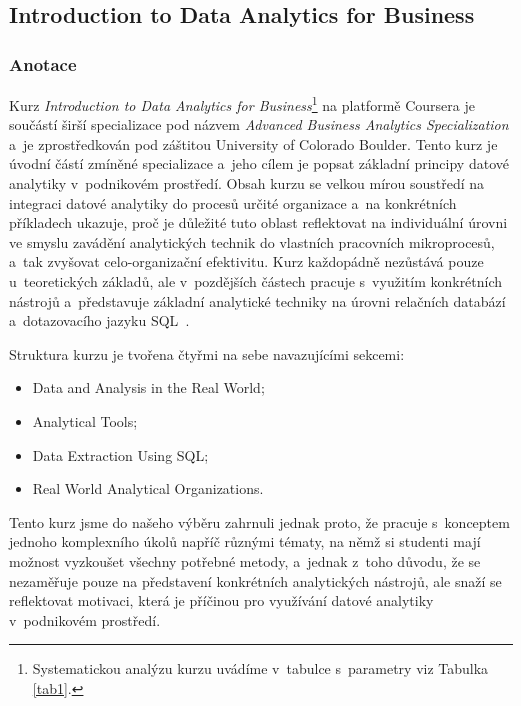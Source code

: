 \hypertarget{introduction-to-data-analytics-for-business}{%
\subsection{Introduction to Data Analytics for Business}\label{introduction-to-data-analytics-for-business}}

\hypertarget{anotace}{%
\subsubsection{Anotace}\label{anotace}}

Kurz \emph{Introduction to Data Analytics for Business}\footnote{Systematickou analýzu kurzu uvádíme v~tabulce s~parametry viz Tabulka \ref{tab1}.} na platformě Coursera je součástí širší specializace pod názvem \emph{Advanced Business Analytics Specialization} a~je zprostředkován pod záštitou University of Colorado Boulder. Tento kurz je úvodní částí zmíněné specializace a~jeho cílem je popsat základní principy datové analytiky v~podnikovém prostředí. Obsah kurzu se velkou mírou soustředí na integraci datové analytiky do procesů určité organizace a~na konkrétních příkladech ukazuje, proč je důležité tuto oblast reflektovat na individuální úrovni ve smyslu zavádění analytických technik do vlastních pracovních mikroprocesů, a~tak zvyšovat celo-organizační efektivitu. Kurz každopádně nezůstává pouze u~teoretických základů, ale v~pozdějších částech pracuje s~využitím konkrétních nástrojů a~představuje základní analytické techniky na úrovni relačních databází a~dotazovacího jazyku SQL~\parencite{course1}.

Struktura kurzu je tvořena čtyřmi na sebe navazujícími sekcemi:

\begin{itemize}
\tightlist
\item
  Data and Analysis in the Real World;
\item
  Analytical Tools;
\item
  Data Extraction Using SQL;
\item
  Real World Analytical Organizations.
\end{itemize}

Tento kurz jsme do našeho výběru zahrnuli jednak proto, že pracuje s~konceptem jednoho komplexního úkolů napříč různými tématy, na němž si studenti mají možnost vyzkoušet všechny potřebné metody, a~jednak z~toho důvodu, že se nezaměřuje pouze na představení konkrétních analytických nástrojů, ale snaží se reflektovat motivaci, která je příčinou pro využívání datové analytiky v~podnikovém prostředí.

